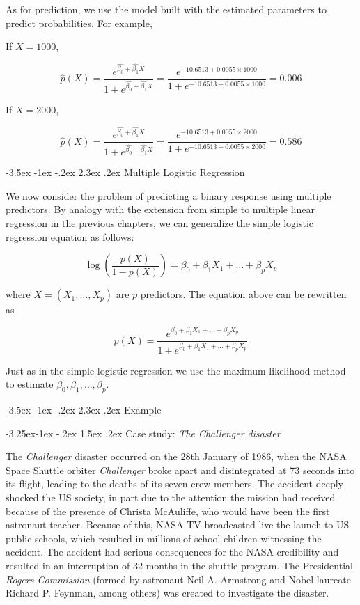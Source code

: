 \documentclass[]{book}
\makeatletter
\renewcommand\section{\@startsection {section}{1}{\z@}%
                                   {-3.5ex \@plus -1ex \@minus -.2ex}%
                                   {2.3ex \@plus.2ex}%
                                   {\normalfont\Large\bfseries\color{ForestGreen}}}
\renewcommand\subsection{\@startsection{subsection}{2}{\z@}%
                                     {-3.25ex\@plus -1ex \@minus -.2ex}%
                                     {1.5ex \@plus .2ex}%
                                     {\normalfont\large\bfseries\color{Violet}}}
\theoremstyle{definition}
\theoremstyle{definition}
\theoremstyle{definition}
\theoremstyle{remark}
\makeatother
\begin{document}
As for prediction, we use the model built with the estimated parameters
to predict probabilities. For example,

If \(X=1000\),

\[ \hat{p}(X) = \frac{e^{\hat{\beta_0} + \hat{\beta_1} X}}{1+e^{\hat{\beta_0} + \hat{\beta_1} X}} = \frac{e^{-10.6513+0.0055 \times 1000}}{1+e^{-10.6513+0.0055 \times 1000}} = 0.006\]

If \(X=2000\),

\[ \hat{p}(X) = \frac{e^{\hat{\beta_0} + \hat{\beta_1} X}}{1+e^{\hat{\beta_0} + \hat{\beta_1} X}} = \frac{e^{-10.6513+0.0055 \times 2000}}{1+e^{-10.6513+0.0055 \times 2000}} = 0.586\]

\section{Multiple Logistic
Regression}\label{multiple-logistic-regression}

We now consider the problem of predicting a binary response using
multiple predictors. By analogy with the extension from simple to
multiple linear regression in the previous chapters, we can generalize
the simple logistic regression equation as follows:

\[ \log( \frac{p(X)}{1-p(X)} ) = \beta_0 + \beta_1 X_1 +  \ldots + \beta_p X_p\]

where \(X=(X_1,\ldots,X_p)\) are \(p\) predictors. The equation above
can be rewritten as

\[ p(X) = \frac{e^{\beta_0 + \beta_1 X_1 +  \ldots + \beta_p X_p}}{1+e^{\beta_0 + \beta_1 X_1 +  \ldots + \beta_p X_p}} \]

Just as in the simple logistic regression we use the maximum likelihood
method to estimate \(\beta_0,\beta_1,\ldots,\beta_p\).

\section{Example}\label{logreg-examps}

\subsection{\texorpdfstring{Case study: \emph{The Challenger
disaster}}{Case study: The Challenger disaster}}\label{logreg-examps-challenger}

The \emph{Challenger} disaster occurred on the 28th January of 1986,
when the NASA Space Shuttle orbiter \emph{Challenger} broke apart and
disintegrated at 73 seconds into its flight, leading to the deaths of
its seven crew members. The accident deeply shocked the US society, in
part due to the attention the mission had received because of the
presence of Christa McAuliffe, who would have been the first
astronaut-teacher. Because of this, NASA TV broadcasted live the launch
to US public schools, which resulted in millions of school children
witnessing the accident. The accident had serious consequences for the
NASA credibility and resulted in an interruption of 32 months in the
shuttle program. The Presidential \emph{Rogers Commission} (formed by
astronaut Neil A. Armstrong and Nobel laureate Richard P. Feynman, among
others) was created to investigate the disaster.
\end{document}
